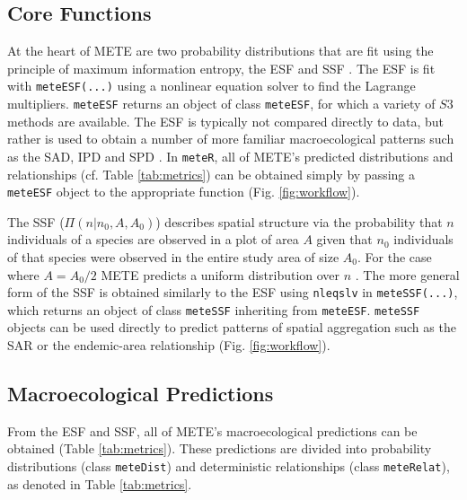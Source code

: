 \subsection{Core Functions}

At the heart of METE are two probability distributions that are fit
using the principle of maximum information entropy, the ESF and SSF
\citep{Harte:2011ut}. The ESF is fit with \texttt{meteESF(...)} using
a nonlinear equation solver \citep[package
\texttt{nleqslv};][]{Hasselman2014} to find the Lagrange multipliers.
\texttt{meteESF} returns an object of class \texttt{meteESF}, for which a
variety of $S3$ methods are available. The ESF is typically not
compared directly to data, but rather is used to obtain a number of
more familiar macroecological patterns such as the SAD, IPD and SPD
\citep[Table \ref{tab:metrics};][note that we use power---the ``P'' in
IPD and SPD to refer to metabolic rate]{Harte:2008uf, Harte:2011ut}.
In \texttt{meteR}, all of METE's predicted distributions and
relationships (cf. Table \ref{tab:metrics}) can be obtained simply by
passing a \texttt{meteESF} object to the appropriate function (Fig.
\ref{fig:workflow}).

The SSF ($\Pi(n|n_0, A, A_0)$) describes spatial structure via the
probability that $n$ individuals of a species are observed in a plot
of area $A$ given that $n_0$ individuals of that species were observed
in the entire study area of size $A_0$. For the case where $A=A_{0}/2$
METE predicts a uniform distribution over $n$ \citep[p.
159][]{Harte:2011ut}. The more general form of the SSF is obtained
similarly to the ESF using \texttt{nleqslv} in \texttt{meteSSF(...)},
which returns an object of class \texttt{meteSSF} inheriting from
\texttt{meteESF}. \texttt{meteSSF} objects can be used directly to
predict patterns of spatial aggregation such as the SAR or the
endemic-area relationship (Fig. \ref{fig:workflow}).


\subsection{Macroecological Predictions}

From the ESF and SSF, all of METE's macroecological predictions can be
obtained (Table \ref{tab:metrics}). These predictions are divided into
probability distributions (class \texttt{meteDist}) and deterministic
relationships (class \texttt{meteRelat}), as denoted in Table
\ref{tab:metrics}.

